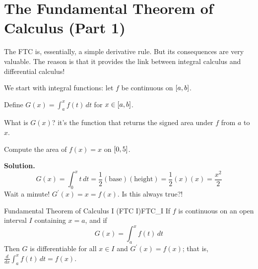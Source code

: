 \section{The Fundamental Theorem of Calculus (Part 1)}
The FTC is, essentially, a simple derivative rule. But
its consequences are very valuable. The reason is that it
provides the link between integral calculus and
differential calculus!

We start with integral functions: let $ f $ be
continuous on $ \interval{a}{b} $.

Define
$ \displaystyle G(x)=\int_{a}^{x} f(t)\, d{t} $
for $ x\in\interval{a}{b} $.

What is $ G(x) $? it's the function that returns the signed
area under $ f $ from $ a $ to $ x $.

\begin{Example}{}{}
    Compute the area of $ f(x)=x $ on $ \interval{0}{5} $.

    \textbf{Solution.}
    \[
        G(x)
        =\int_{0}^{x} t\, d{t}
        =\frac{1}{2}(\text{base})(\text{height})
        =\frac{1}{2}(x)(x)
        =\frac{x^2}{2}
    \]
    Wait a minute! $ G^\prime(x)=x=f(x) $. Is this always true?!
\end{Example}

\begin{Theorem}{Fundamental Theorem of Calculus I (FTC I)}{FTC_I}
    If $ f $ is continuous on an open interval $ I $ containing
    $ x=a $, and if
    \[ G(x)=\int_{a}^{x} f(t)\, d{t}  \]
    Then $ G $ is differentiable for all $ x\in I $ and
    $ G^\prime(x)=f(x) $; that is,
    $ \displaystyle \frac{d}{dx}\int_{a}^{x} f(t)\, d{t}=f(x) $.
\end{Theorem}

